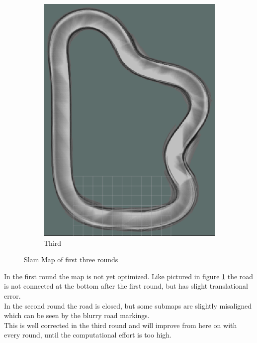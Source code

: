 \begin{figure}[H]
\begin{subfigure}{.3\linewidth}
		\includegraphics[width=\textwidth]{Pictures/1slamtest3}
		\caption{Third}
	\end{subfigure}

	\caption{Slam Map of first three rounds}
	\label{1slamtest}

\end{figure}

In the first round the map is not yet optimized. Like pictured in  figure \ref{1slamtest} the road is not connected at the bottom after the first round, but has slight translational error.\\
In the second round the road is closed, but some submaps are slightly misaligned which can be seen by the blurry road markings.\\
This is well corrected in the third round and will improve from here on with every round, until the computational effort is too high.\\

